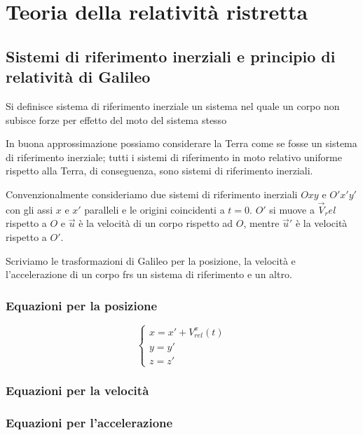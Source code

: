 \section{Teoria della relatività ristretta}
    \subsection{Sistemi di riferimento inerziali e principio di relatività di Galileo}
    \par Si definisce sistema di riferimento inerziale un sistema nel quale un corpo non subisce forze per effetto del moto del sistema stesso
    \par In buona approssimazione possiamo considerare la Terra come se fosse un sistema di riferimento inerziale; tutti i sistemi di riferimento in moto relativo uniforme rispetto alla Terra, di conseguenza, sono sistemi di riferimento inerziali.
    \par Convenzionalmente consideriamo due sistemi di riferimento inerziali $Oxy$ e $O'x'y'$ con gli assi $x$ e $x'$ paralleli e le origini coincidenti a $t=0$. $O'$ si muove a $\vec{V}_rel$ rispetto a $O$ e $\vec{u}$ è la velocità di un corpo rispetto ad $O$, mentre $\vec{u}'$ è la velocità rispetto a $O'$.
    \par Scriviamo le trasformazioni di Galileo per la posizione, la velocità e l'accelerazione di un corpo frs un sistema di riferimento e un altro.
    \subsubsection{Equazioni per la posizione}
    \begin{equation}
        \begin{cases}
        x = x' + V_{rel}^x(t)\\
        y = y'\\
        z = z'
        \end{cases}
     \end{equation}
    \subsubsection{Equazioni per la velocità}
    \subsubsection{Equazioni per l'accelerazione}